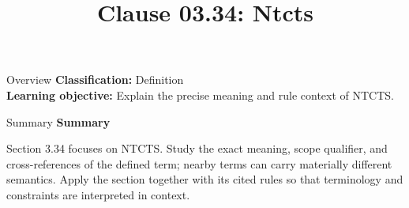 \documentclass[10pt,letterpaper]{article}
\title{Clause 03.34: Ntcts}
\author{}
\date{}
\begin{document}
\maketitle
\begin{CornellOverviewBox}{Overview}
\textbf{Classification:} Definition\\[2pt]
\textbf{Learning objective:} Explain the precise meaning and rule context of NTCTS.
\end{CornellOverviewBox}\begin{CornellSummaryBox}{Summary}
{\sffamily\bfseries\color{Accent} Summary}\par\vspace{3pt}Section 3.34 focuses on NTCTS. Study the exact meaning, scope qualifier, and cross-references of the defined term; nearby terms can carry materially different semantics. Apply the section together with its cited rules so that terminology and constraints are interpreted in context.
\end{CornellSummaryBox}
\end{document}
